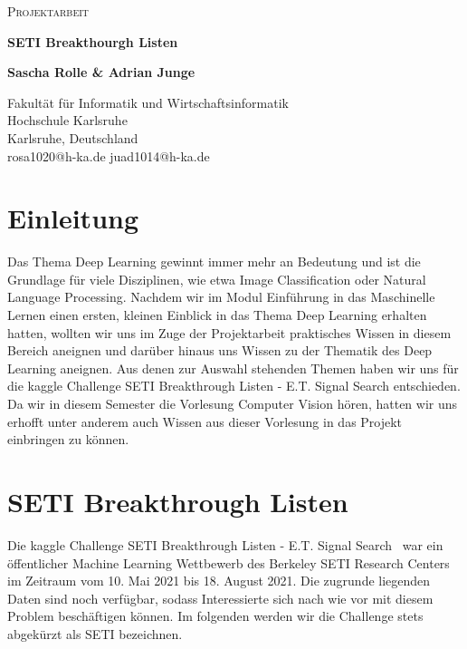 \documentclass[12pt, a4paper]{article}
\begin{document}
\begin{titlepage}
		\begin{center}
			
			{\scshape\LARGE Projektarbeit \par}
			\vspace{1cm}
			{\huge\bfseries SETI Breakthourgh Listen \par}
			
			\vspace{1.5cm}
			\textbf{Sascha Rolle \& Adrian Junge}
			
			\vspace{4cm}
			\large
			Fakultät für Informatik und Wirtschaftsinformatik\\
			Hochschule Karlsruhe\\
			Karlsruhe, Deutschland\\
			rosa1020@h-ka.de
			juad1014@h-ka.de
		\end{center}
	\end{titlepage}

\tableofcontents
\thispagestyle{empty}
\newpage

\section{Einleitung}
\onehalfspacing
Das Thema Deep Learning gewinnt immer mehr an Bedeutung und ist die Grundlage für viele Disziplinen, wie etwa Image Classification oder Natural Language Processing. Nachdem wir im Modul Einführung in das Maschinelle Lernen einen ersten, kleinen Einblick in das Thema Deep Learning erhalten hatten, wollten wir uns im Zuge der Projektarbeit praktisches Wissen in diesem Bereich aneignen und darüber hinaus uns Wissen zu der Thematik des Deep Learning aneignen. Aus denen zur Auswahl stehenden Themen haben wir uns für die kaggle Challenge SETI Breakthrough Listen - E.T. Signal Search entschieden. Da wir in diesem Semester die Vorlesung Computer Vision hören, hatten wir uns erhofft unter anderem auch Wissen aus dieser Vorlesung in das Projekt einbringen zu können. 

\section{SETI Breakthrough Listen}
Die kaggle Challenge SETI Breakthrough Listen - E.T. Signal Search~\cite{o4} war ein öffentlicher Machine Learning Wettbewerb des Berkeley SETI Research Centers im Zeitraum vom 10. Mai 2021 bis 18. August 2021. Die zugrunde liegenden Daten sind noch verfügbar, sodass Interessierte sich nach wie vor mit diesem Problem beschäftigen können. Im folgenden werden wir die Challenge stets abgekürzt als SETI bezeichnen.
\end{document}
